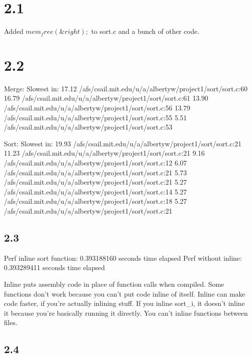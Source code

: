 \documentclass[12pt]{article}
\begin{document}
\maketitle
\section{2.1}
Added $mem_free(\&right);$ to sort.c and a bunch of other code.  

\section{2.2}
Merge:
Slowest in:
   17.12 /afs/csail.mit.edu/u/a/albertyw/project1/sort/sort.c:60
   16.79 /afs/csail.mit.edu/u/a/albertyw/project1/sort/sort.c:61
   13.90 /afs/csail.mit.edu/u/a/albertyw/project1/sort/sort.c:56
   13.79 /afs/csail.mit.edu/u/a/albertyw/project1/sort/sort.c:55
    5.51 /afs/csail.mit.edu/u/a/albertyw/project1/sort/sort.c:53

Sort:
Slowest in:
   19.93 /afs/csail.mit.edu/u/a/albertyw/project1/sort/sort.c:21
   11.23 /afs/csail.mit.edu/u/a/albertyw/project1/sort/sort.c:21
    9.16 /afs/csail.mit.edu/u/a/albertyw/project1/sort/sort.c:12
    6.07 /afs/csail.mit.edu/u/a/albertyw/project1/sort/sort.c:21
    5.73 /afs/csail.mit.edu/u/a/albertyw/project1/sort/sort.c:21
    5.27 /afs/csail.mit.edu/u/a/albertyw/project1/sort/sort.c:14
    5.27 /afs/csail.mit.edu/u/a/albertyw/project1/sort/sort.c:18
    5.27 /afs/csail.mit.edu/u/a/albertyw/project1/sort/sort.c:21


\subsection{2.3}
Perf inline sort function: 0.393188160  seconds time elapsed
Perf without inline: 0.393289411  seconds time elapsed

Inline puts assembly code in place of function calls when compiled.  Some functions don't work because you can't put code inline of itself.
Inline can make code faster, if you're actually inlining stuff.  
If you inline sort_i, it doesn't inline it because you're basically running it directly.  
You can't inline functions between files.  

\subsection{2.4}
\end{document}
